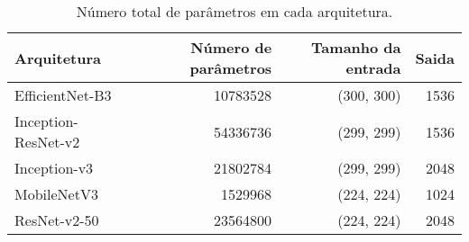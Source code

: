 \begin{table}
\caption{Número total de parâmetros em cada arquitetura.}
\label{tab:extractor:model_params}
\begin{tabular}{l|r|r|r}
\toprule
Arquitetura & Número de parâmetros & Tamanho da entrada & Saida \\
\midrule
EfficientNet-B3 & 10783528 & (300, 300) & 1536 \\
Inception-ResNet-v2 & 54336736 & (299, 299) & 1536 \\
Inception-v3 & 21802784 & (299, 299) & 2048 \\
MobileNetV3 & 1529968 & (224, 224) & 1024 \\
ResNet-v2-50 & 23564800 & (224, 224) & 2048 \\
\bottomrule
\end{tabular}
\end{table}
